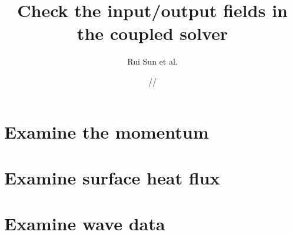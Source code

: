 \documentclass[11pt]{report}
\title{\textbf{Check the input/output fields in the coupled solver}}
\author{Rui Sun et al.}
\date{\oldstylenums{07}/\oldstylenums{01}/\oldstylenums{2018}}
\begin{document}
\maketitle
 
\section{Examine the momentum}



\section{Examine surface heat flux}








\section{Examine wave data}


\end{document}
